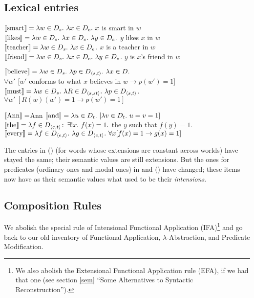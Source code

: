 \subsection{Lexical entries}

\pex\label{124}
\a $\llbracket \mbox{smart} \rrbracket = \lambda w\in D_{s}.\ \lambda x\in D_{e}.\ x$ is smart in $w$ 
\a $\sv{\mbox{likes}} = \lambda w\in D_{s}.\ \lambda x\in D_{e}.\ \lambda y\in D_{e}$. $y$ likes $x$ in $w$ 
\a $\sv{\mbox{teacher}} = \lambda w\in D_{s}.\ \lambda x\in D_{e}$. $x$ is a teacher in $w$ 
\a $\sv{\mbox{friend}} = \lambda w\in D_{s}.\ \lambda x\in D_{e}.\ \lambda y\in D_{e}$. $y$ is $x$'s friend in $w$
\xe

\pex
\a $\sv{\mbox{believe}} = \lambda w\in D_{s}.\ \lambda p\in D_{\angles{s,t}}.\ \lambda x\in D.$ \\
\null\hfill$\forall w'$ [$w'$ conforms to what $x$ believes in $w \rightarrow p(w') = 1$] 
\a $\sv{\mbox{must}} = \lambda w\in D_{s}.\ \lambda R\in D_{\angles{s,st}}.\ \lambda p\in D_{\angles{s,t}}$.\\
\null\hfill$\forall w'\ [R(w)(w') = 1 \rightarrow p(w') = 1]$
\xe

\pex
\a $\llbracket \mbox{Ann} \rrbracket = $Ann 
\a $\llbracket \mbox{and} \rrbracket = \lambda u\in D_{t}.\ [ \lambda v\in D_{t}.\ u=v=1]$ 
\a $\llbracket \mbox{the} \rrbracket = \lambda f\in D_{\langle e,t \rangle}\colon\thinspace \exists !x.\ f(x) = 1.$ the $y$ such that $f(y) = 1$. 
\a $\llbracket \mbox{every} \rrbracket = \lambda f\in D_{\langle e,t \rangle}.\ \lambda g\in D_{\langle e,t \rangle}.\ \forall x [ f(x) = 1 \rightarrow g(x) = 1]$
\xe

The entries in (\lastx) (for words whose extensions are constant across worlds) have stayed the same; their semantic values are still extensions. But the ones for predicates (ordinary ones and modal ones) in  and (\blastx) have changed; these items now have as their semantic values what used to be their \emph{intensions}.

\subsection{Composition Rules}

We abolish the special rule of Intensional Functional Application
(IFA)\footnote{We also abolish the Extensional Functional Application rule
  (EFA), if we had that one (see section \ref{sem} ``Some Alternatives to
  Syntactic Reconstruction'').} and go back to our old inventory of Functional
Application, $\lambda$-Abstraction, and Predicate Modification.

